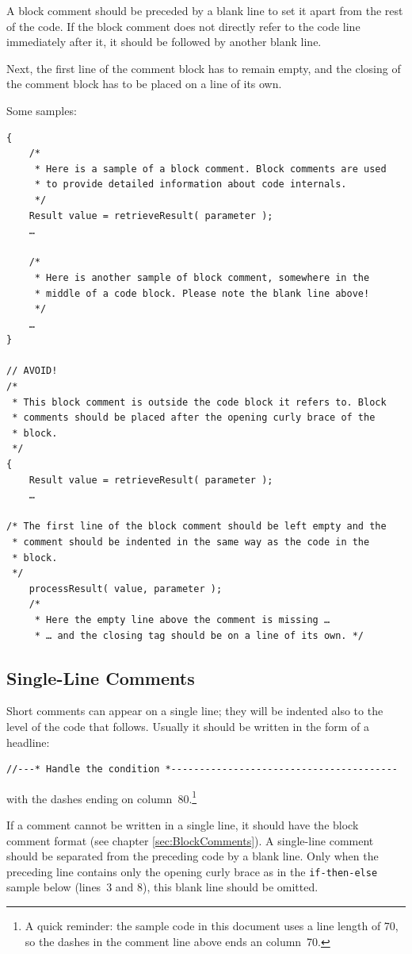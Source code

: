 \documentclass[11pt,a4paper, titlepage, parskip=half, headsepline, footsepline, cleardoublepage=current, headheight=1cm]{scrbook}
\newcommand*{\tqref}[1]{\hyperref[{#1}]{\ref*{#1}}}
\begin{document}
A block comment should be preceded by a blank line to set it apart from the rest of the code. If the block comment does not directly refer to the code line immediately after it, it should be followed by another blank line.

Next, the first line of the comment block has to remain empty, and the closing of the comment block has to be placed on a line of its own.

Some samples:
\begin{lstlisting}
{
    /*
     * Here is a sample of a block comment. Block comments are used
     * to provide detailed information about code internals.
     */
    Result value = retrieveResult( parameter );
    …

    /*
     * Here is another sample of block comment, somewhere in the
     * middle of a code block. Please note the blank line above!
     */
    …
}

// AVOID!
/*
 * This block comment is outside the code block it refers to. Block 
 * comments should be placed after the opening curly brace of the
 * block.
 */
{
    Result value = retrieveResult( parameter );
    …
 
/* The first line of the block comment should be left empty and the
 * comment should be indented in the same way as the code in the
 * block.
 */
    processResult( value, parameter );
    /* 
     * Here the empty line above the comment is missing …
     * … and the closing tag should be on a line of its own. */
\end{lstlisting}
 
 
\subsection{Single-Line Comments}\label{sec:SingleLineComments}
Short comments can appear on a single line; they will be indented also to the level of the code that follows. Usually it should be written in the form of a headline:
\begin{lstlisting}
//---* Handle the condition *----------------------------------------
\end{lstlisting}
with the dashes ending on column~80.\footnote{A quick reminder: the sample code in this document uses a line length of 70, so the dashes in the comment line above ends an column~70.}

If a comment cannot be written in a single line, it should have the block comment format (see chapter \tqref{sec:BlockComments}). A single-line comment should be separated from the preceding code by a blank line. Only when the preceding line contains only the opening curly brace as in the \lstinline|if-then-else| sample below (lines~3 and 8), this blank line should be omitted. 
\end{document}
